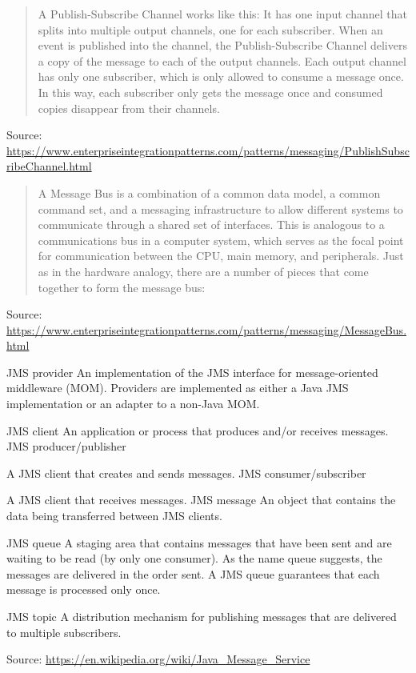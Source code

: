 \documentclass[Screen16to9,17pt]{foils}
\begin{document}
\begin{quote}\footnotesize
A Publish-Subscribe Channel works like this: It has one input channel that splits into multiple output channels, one for each subscriber. When an event is published into the channel, the Publish-Subscribe Channel delivers a copy of the message to each of the output channels. Each output channel has only one subscriber, which is only allowed to consume a message once. In this way, each subscriber only gets the message once and consumed copies disappear from their channels.
\end{quote}

{\footnotesize Source:\\ \url{https://www.enterpriseintegrationpatterns.com/patterns/messaging/PublishSubscribeChannel.html}}




\begin{quote}\footnotesize
A Message Bus is a combination of a common data model, a common command set, and a messaging infrastructure to allow different systems to communicate through a shared set of interfaces. This is analogous to a communications bus in a computer system, which serves as the focal point for communication between the CPU, main memory, and peripherals. Just as in the hardware analogy, there are a number of pieces that come together to form the message bus:
\end{quote}
Source: \url{https://www.enterpriseintegrationpatterns.com/patterns/messaging/MessageBus.html}



\begin{list2}
\item JMS provider
An implementation of the JMS interface for message-oriented middleware (MOM). Providers are implemented as either a Java JMS implementation or an adapter to a non-Java MOM.
\item JMS client
An application or process that produces and/or receives messages.
JMS producer/publisher
\item A JMS client that creates and sends messages.
JMS consumer/subscriber
\item A JMS client that receives messages.
JMS message
An object that contains the data being transferred between JMS clients.
\item JMS queue
A staging area that contains messages that have been sent and are waiting to be read (by only one consumer). As the name queue suggests, the messages are delivered in the order sent. A JMS queue guarantees that each message is processed only once.
\item JMS topic
A distribution mechanism for publishing messages that are delivered to multiple subscribers.
\end{list2}
Source: \url{https://en.wikipedia.org/wiki/Java_Message_Service}
\end{document}
